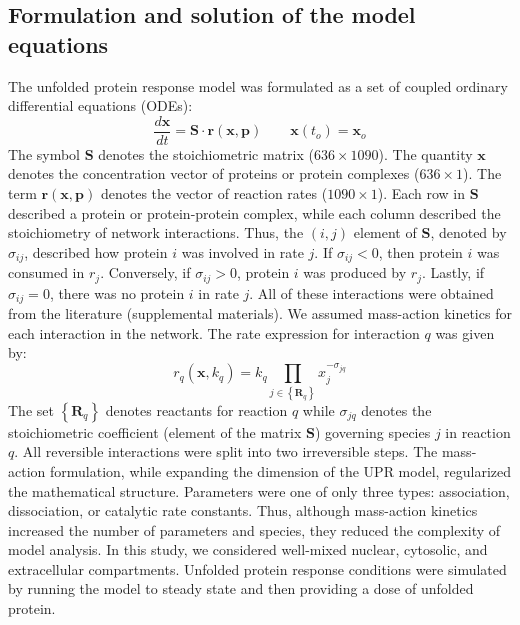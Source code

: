 \documentclass[fleqn,10pt]{wlscirep}
\begin{document}
\subsection*{Formulation and solution of the model equations}
The unfolded protein response model was formulated as a set of coupled ordinary differential equations (ODEs):
\begin{equation}\label{asseassertain_massbalance}
\frac{d\mathbf{x}}{dt}=\mathbf{S}\cdot\mathbf{r}\left(\mathbf{x},\mathbf{p}\right)\qquad\mathbf{x}\left(t_{o}\right)=\mathbf{x}_{o}
\end{equation}
The symbol $\mathbf{S}$ denotes the stoichiometric matrix ($636\times 1090$). The quantity $\mathbf{x}$ denotes the concentration vector of proteins or protein complexes ($636\times 1$).
The term $\mathbf{r}\left(\mathbf{x},\mathbf{p}\right)$ denotes the vector of reaction rates ($1090\times{1}$).
Each row in $\mathbf{S}$ described a protein or protein-protein complex,
while each column described the stoichiometry of network interactions.
Thus, the $(i,j)$ element of $\mathbf{S}$, denoted by $\sigma_{ij}$, described how protein $i$ was involved in rate $j$.
If $\sigma_{ij}<0$, then protein $i$ was consumed in $r_j$. Conversely, if $\sigma_{ij}>0$, protein $i$ was
produced by $r_j$. Lastly, if $\sigma_{ij}=0$, there was no protein $i$ in rate $j$. All of these interactions were obtained from the literature (supplemental materials).
We assumed mass-action kinetics for each interaction in the network.
The rate expression for interaction $q$ was given by:
\begin{equation}\label{eq-mass-action}
r_{q}\left(\mathbf{x},k_{q}\right)=k_{q}\prod_{j\in\left\{\mathbf{R}_{q}\right\}}x_{j}^{-\sigma_{jq}}
\end{equation}
The set $\left\{\mathbf{R}_{q}\right\}$ denotes reactants for reaction $q$ while $\sigma_{jq}$ denotes the stoichiometric coefficient (element of the matrix $\mathbf{S}$) governing species $j$ in reaction $q$.
All reversible interactions were split into two irreversible steps. The mass-action formulation, while expanding the dimension of the UPR model,
regularized the mathematical structure. Parameters were one of only three types: association, dissociation, or catalytic rate constants.
Thus, although mass-action kinetics increased the number of parameters and species, they reduced the complexity of model analysis.
In this study, we considered well-mixed nuclear, cytosolic, and extracellular compartments.
Unfolded protein response conditions were simulated by running the model to steady state and then providing a dose of unfolded protein.
\end{document}
